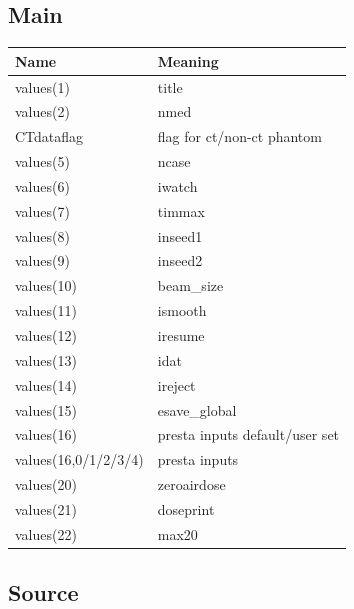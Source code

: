 \documentclass[12pt]{book}
\begin{document}
\subsection{Main}
\begin{tabular} {|p{1.5in}|p{3.75in}|}
\hline
Name & Meaning \\ \hline
values(1) & title \\
values(2) & nmed \\
CTdataflag & flag for ct/non-ct phantom\\
values(5) & ncase \\
values(6) & iwatch \\
values(7) & timmax \\
values(8) & inseed1 \\
values(9) & inseed2 \\
values(10) & beam\_size \\
values(11) & ismooth \\
values(12) & iresume \\
values(13) & idat \\
values(14) & ireject \\
values(15) & esave\_global \\
values(16) & presta inputs default/user set \\
values(16,0/1/2/3/4) & presta inputs \\
values(20) & zeroairdose \\
values(21) & doseprint \\
values(22) & max20 \\ \hline
\end{tabular}

\subsection{Source}
\end{document}
